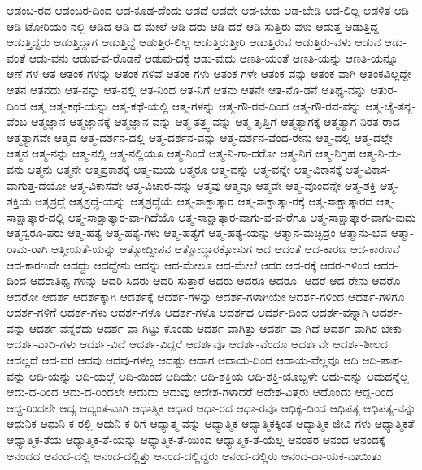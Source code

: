 {ಆಡಂಬ-ರದ
ಆಡಂಬರ-ದಿಂದ
ಆಡ-ಕೂಡ-ದೆಂದು
ಆಡದೆ
ಆಡದೇ
ಆಡ-ಬೇಕು
ಆಡ-ಬೇಡಿ
ಆಡ-ಲಿಲ್ಲ
ಆಡಳಿತ
ಆಡಿ
ಆಡಿ-ಟೋರಿಯಂ-ನಲ್ಲಿ
ಆಡಿದ
ಆಡಿ-ದ-ಮೇಲೆ
ಆಡಿ-ದರು
ಆಡಿ-ದರೆ
ಆಡಿ-ಸುತ್ತಿರು-ವಳು
ಆಡುತ್ತ
ಆಡುತ್ತಿದ್ದ
ಆಡುತ್ತಿದ್ದರು
ಆಡುತ್ತಿದ್ದಾಗ
ಆಡುತ್ತಿದ್ದೆ
ಆಡುತ್ತಿರ-ಲಿಲ್ಲ
ಆಡುತ್ತಿರುತ್ತೀರಿ
ಆಡುತ್ತಿರುವ
ಆಡುತ್ತಿರು-ವಳು
ಆಡುವ
ಆಡು-ವಂತೆ
ಆಡು-ವನು
ಆಡುವ-ವ-ರೊಡನೆ
ಆಡುವು-ದಕ್ಕೆ
ಆಡು-ವುದು
ಆಣತಿ-ಯಂತೆ
ಆಣತಿ-ಯನ್ನು
ಆಣತಿ-ಯನ್ನೂ
ಆಣೆ-ಗಳ
ಆತ
ಆತಂಕ-ಗಳನ್ನು
ಆತಂಕ-ಗಳಿವೆ
ಆತಂಕ-ಗಳು
ಆತಂಕ-ಗಳೇ
ಆತಂಕ-ವನ್ನು
ಆತಂಕ-ವಾಗಿ
ಆತಂಕವಿಲ್ಲದ್ದೇ
ಆತನ
ಆತನದು
ಆತ-ನನ್ನು
ಆತ-ನಲ್ಲಿ
ಆತ-ನಿಂದ
ಆತ-ನಿಗೆ
ಆತನು
ಆತನೇ
ಆತ-ನೊ-ಡನೆ
ಆತಿಥ್ಯ-ವನ್ನು
ಆತುರ-ದಿಂದ
ಆತ್ಮ
ಆತ್ಮ-ಕಥೆ-ಯನ್ನು
ಆತ್ಮ-ಕಥೆ-ಯಲ್ಲಿ
ಆತ್ಮ-ಗಳನ್ನು
ಆತ್ಮ-ಗೌ-ರವ-ದಿಂದ
ಆತ್ಮ-ಗೌ-ರವ-ವನ್ನು
ಆತ್ಮ-ಚೈ-ತನ್ಯ-ವೆಂಬ
ಆತ್ಮಜ್ಞಾನ
ಆತ್ಮಜ್ಞಾನಕ್ಕೆ
ಆತ್ಮಜ್ಞಾನ-ವನ್ನು
ಆತ್ಮ-ತತ್ತ್ವ-ವನ್ನು
ಆತ್ಮ-ತೃಪ್ತಿಗೆ
ಆತ್ಮತ್ಯಾಗಕ್ಕೆ
ಆತ್ಮತ್ಯಾಗ-ನಿರತ-ರಾದ
ಆತ್ಮತ್ಯಾಗವೇ
ಆತ್ಮದ
ಆತ್ಮ-ದರ್ಶನ-ದಲ್ಲಿ
ಆತ್ಮ-ದರ್ಶನ-ವನ್ನು
ಆತ್ಮ-ದರ್ಶನ-ವೆಂದ-ರೇನು
ಆತ್ಮ-ದಲ್ಲಿ
ಆತ್ಮ-ದಲ್ಲೇ
ಆತ್ಮನ
ಆತ್ಮ-ನನ್ನು
ಆತ್ಮ-ನಲ್ಲಿ
ಆತ್ಮ-ನಲ್ಲಿಯೂ
ಆತ್ಮ-ನಿಂದೆ
ಆತ್ಮ-ನಿ-ಗಾ-ದರೋ
ಆತ್ಮ-ನಿಗೆ
ಆತ್ಮ-ನಿಗ್ರಹ
ಆತ್ಮ-ನಿ-ರು-ವನು
ಆತ್ಮನು
ಆತ್ಮನೇ
ಆತ್ಮಪ್ರಕಾಶಕ್ಕೆ
ಆತ್ಮ-ಮಯ
ಆತ್ಮರೂ
ಆತ್ಮ-ವನ್ನು
ಆತ್ಮ-ವನ್ನೇ
ಆತ್ಮ-ವಿಕಾಸಕ್ಕೆ
ಆತ್ಮ-ವಿಕಾಸ-ವಾಗುತ್ತ-ದೆಯೋ
ಆತ್ಮ-ವಿಕಾಸವೇ
ಆತ್ಮ-ವಿಚಾರ-ವನ್ನು
ಆತ್ಮವು
ಆತ್ಮವೂ
ಆತ್ಮವೇ
ಆತ್ಮ-ವೊಂದನ್ನೇ
ಆತ್ಮ-ಶಕ್ತಿ
ಆತ್ಮ-ಶಕ್ತಿಯ
ಆತ್ಮಶ್ರದ್ಧೆ
ಆತ್ಮಶ್ರದ್ಧೆ-ಯನ್ನು
ಆತ್ಮಶ್ರದ್ಧೆಯೆ
ಆತ್ಮ-ಸಾಕ್ಷಾತ್ಕಾರ
ಆತ್ಮ-ಸಾಕ್ಷಾತ್ಕಾ-ರಕ್ಕೆ
ಆತ್ಮ-ಸಾಕ್ಷಾತ್ಕಾರದ
ಆತ್ಮ-ಸಾಕ್ಷಾತ್ಕಾರ-ದಲ್ಲಿ
ಆತ್ಮ-ಸಾಕ್ಷಾತ್ಕಾರ-ವಾ-ಗಿದೆಯೊ
ಆತ್ಮ-ಸಾಕ್ಷಾತ್ಕಾರ-ವಾಗು-ವ-ವ-ರೆಗೂ
ಆತ್ಮ-ಸಾಕ್ಷಾತ್ಕಾರ-ವಾಗು-ವುದು
ಆತ್ಮಸ್ವರೂ-ಪರು
ಆತ್ಮ-ಹತ್ಯೆ
ಆತ್ಮ-ಹತ್ಯೆ-ಗಳು
ಆತ್ಮ-ಹತ್ಯೆಗೆ
ಆತ್ಮ-ಹತ್ಯೆ-ಯನ್ನು
ಆತ್ಮಾನ-ಮಚ್ಛಿದ್ರಂ
ಆತ್ಮಾನು-ಭವ
ಆತ್ಮಾ-ರಾಮ-ರಾಗಿ
ಆತ್ಮೀಯತೆ-ಯನ್ನು
ಆತ್ಮೋದ್ದೀಪನ
ಆತ್ಮೋದ್ಧಾರಕ್ಕೋಸುಗ
ಆದ
ಆದಂತೆ
ಆದ-ಕಾರಣ
ಆದ-ಕಾರಣವೆ
ಆದ-ಕಾರಣವೇ
ಆದದ್ದು
ಆದದ್ದೇನು
ಆದನ್ನು
ಆದ-ಮೇಲೂ
ಆದ-ಮೇಲೆ
ಆದರ
ಆದ-ರಕ್ಕೆ
ಆದರ-ಗಳಿಂದ
ಆದರ-ದಿಂದ
ಆದರಾತಿಥ್ಯ-ಗಳನ್ನು
ಆದರಿ-ಸಿದರು
ಆದರಿ-ಸುತ್ತಾರೆ
ಆದರು
ಆದರೂ
ಆದರೂ-
ಆದರೆ
ಆದ-ರೇನು
ಆದರೊ
ಆದರೋ
ಆದರ್ಶ
ಆದರ್ಶಕ್ಕಾಗಿ
ಆದರ್ಶಕ್ಕೆ
ಆದರ್ಶ-ಗಳನ್ನು
ಆದರ್ಶ-ಗಳಾಗಿಯೇ
ಆದರ್ಶ-ಗಳಿಂದ
ಆದರ್ಶ-ಗಳಿಗೂ
ಆದರ್ಶ-ಗಳಿಗೆ
ಆದರ್ಶ-ಗಳು
ಆದರ್ಶ-ಗಳೂ
ಆದರ್ಶ-ಗಳೊ
ಆದರ್ಶದ
ಆದರ್ಶ-ದಿಂದ
ಆದರ್ಶ-ವನ್ನಾಗಿ
ಆದರ್ಶ-ವನ್ನು
ಆದರ್ಶ-ವನ್ನೆರೆದು
ಆದರ್ಶ-ವಾ-ಗಿಟ್ಟು-ಕೊಂಡು
ಆದರ್ಶ-ವಾಗಿತ್ತು
ಆದರ್ಶ-ವಾ-ಗಿದೆ
ಆದರ್ಶ-ವಾಗಿರ-ಬೇಕು
ಆದರ್ಶ-ವಾದಿ-ಗಳು
ಆದರ್ಶ-ವಿದೆ
ಆದರ್ಶ-ವಿದ್ದರೆ
ಆದರ್ಶವೂ
ಆದರ್ಶ-ವೆಂದೂ
ಆದರ್ಶವೇ
ಆದರ್ಶ-ಶೀಲದ
ಆದಲ್ಲದೆ
ಆದ-ವರ
ಆದವು
ಆದವು-ಗಳಲ್ಲ
ಆದಷ್ಟು
ಆದಾಗ
ಆದಾಯ-ದಿಂದ
ಆದಾಯ-ವೆಲ್ಲವೂ
ಆದಿ
ಆದಿ-ಪಾಪ-ವನ್ನು
ಆದಿ-ಯನ್ನು
ಆದಿ-ಯಲ್ಲೆ
ಆದಿ-ಯಿಂದ
ಆದಿಯೇ
ಆದಿ-ಶಕ್ತಿಯ
ಆದಿ-ಶಕ್ತಿ-ಯೊಬ್ಬಳೇ
ಆದು-ದನ್ನು
ಆದುದನ್ನೆಲ್ಲ
ಆದು-ದ-ರಿಂದ
ಆದು-ದ-ರಿಂದಲೇ
ಆದುದು
ಆದುವು
ಆದೇಶ-ಗಳಾದರೆ
ಆದೇಶ-ವಿತ್ತರು
ಆದೊಂದು
ಆದ್ದ-ರಿಂದ
ಆದ್ದ-ರಿಂದಲೇ
ಆದ್ಯ
ಆದ್ಯಂತ-ವಾಗಿ
ಆಧಾತ್ಮಿಕ
ಆಧಾರ
ಆಧಾ-ರದ
ಆಧಾ-ರವೂ
ಆಧಿಕ್ಯ-ದಿಂದ
ಆಧಿಪತ್ಯ
ಆಧಿಪತ್ಯ-ವನ್ನು
ಆಧುನಿಕ
ಆಧುನಿ-ಕ-ರಲ್ಲಿ
ಆಧುನಿ-ಕ-ರಿಗೆ
ಆಧ್ಯಾತ್ಮ-ವನ್ನು
ಆಧ್ಯಾತ್ಮಿಕ
ಆಧ್ಯಾತ್ಮಿಕಕ್ಕಿಂತ
ಆಧ್ಯಾತ್ಮಿಕ-ಜೀವಿ-ಗಳು
ಆಧ್ಯಾತ್ಮಿಕತೆ
ಆಧ್ಯಾತ್ಮಿಕ-ತೆಯ
ಆಧ್ಯಾತ್ಮಿಕ-ತೆ-ಯನ್ನು
ಆಧ್ಯಾತ್ಮಿಕ-ತೆ-ಯಿಂದ
ಆಧ್ಯಾತ್ಮಿಕ-ತೆ-ಯೆಲ್ಲ
ಆನಂತರ
ಆನಂದ
ಆನಂದಕ್ಕೆ
ಆನಂದದ
ಆನಂದ-ದಲ್ಲಿ
ಆನಂದ-ದಲ್ಲಿತ್ತು
ಆನಂದ-ದಲ್ಲಿದ್ದರು
ಆನಂದ-ದಲ್ಲಿರು
ಆನಂದ-ದಾ-ಯಕ-ವಾಯಿತು
}
